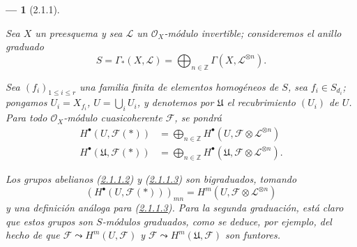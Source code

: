 \documentclass[10pt,oneside,openany]{book}
\theoremstyle{egaenv}\newtheorem*{env}{---}
\theoremstyle{egastatement}
\theoremstyle{egadescription}
\renewcommand{\leq}{\leqslant}
\begin{document}
\begin{env}[2.1.1]
\label{III.2.1.1}
\label{III.2.1.1-fr}

Sea $X$ un preesquema y sea $\mathcal L$ un $\mathcal O_X$-módulo invertible; consideremos el anillo graduado 
\begin{equation}
\label{III.2.1.1.1-fr}
\tag{2.1.1.1}
S=\Gamma_*(X,\mathcal L)
=\bigoplus_{n\in\mathbb Z}\Gamma(X,\mathcal L^{\otimes n}).
\end{equation}

Sea $(f_i)_{1\leq i\leq r}$ una familia finita de elementos \emph{homogéneos} de $S$, sea $f_i\in S_{d_i}$; pongamos $U_i=X_{f_i}$, $U=\bigcup_iU_i$, y denotemos por $\mathfrak U$ el recubrimiento $(U_i)$ de $U$.
Para todo $\mathcal O_X$-módulo cuasicoherente $\mathcal F$, se pondrá
\begin{align}
\label{III.2.1.1.2-fr}
\tag{2.1.1.2}
H^\bullet(U,\mathcal F(*))
&=\bigoplus_{n\in\mathbb Z}
H^\bullet(U,\mathcal F\otimes\mathcal L^{\otimes n})\\
\label{III.2.1.1.3-fr}
\tag{2.1.1.3}
H^\bullet(\mathfrak U,\mathcal F(*))
&=\bigoplus_{n\in\mathbb Z}
H^\bullet(\mathfrak U,\mathcal F\otimes\mathcal L^{\otimes n}).
\end{align}

Los grupos abelianos (\hyperref[III.2.1.1.2-fr]{2.1.1.2}) y
(\hyperref[III.2.1.1.3-fr]{2.1.1.3}) son \emph{bigraduados}, tomando
\[
(H^\bullet(U,\mathcal F(*)))_{mn}
=H^m(U,\mathcal F\otimes\mathcal L^{\otimes n})
\]
y una definición análoga para (\hyperref[III.2.1.1.3]{2.1.1.3}).
Para la segunda graduación, está claro que estos grupos son $S$-módulos graduados, como se deduce, por ejemplo, del hecho de que $\mathcal F\leadsto H^m(U,\mathcal F)$ y $\mathcal F\leadsto H^m(\mathfrak U,\mathcal F)$ son funtores.
\end{env}
\end{document}
